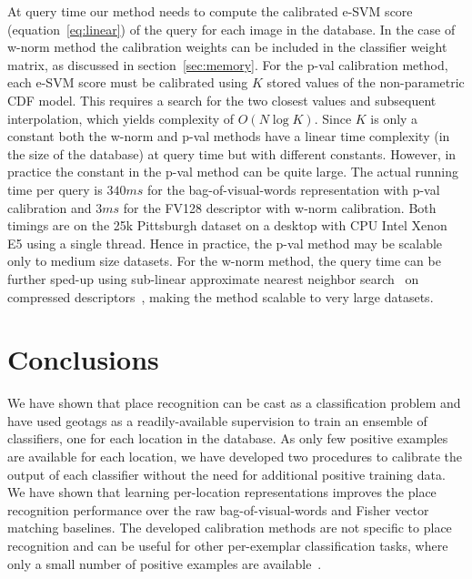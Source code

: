     {
        At query time our method needs to compute the calibrated e-SVM score (equation~\eqref{eq:linear}) of the query for each image in the database. In the case of w-norm method the calibration weights can be included in the classifier weight matrix, as discussed in section~\ref{sec:memory}. For the p-val calibration method, each e-SVM score must be calibrated using $K$ stored values of the non-parametric CDF model. This requires a search for the two closest values and subsequent interpolation, which yields complexity of $O(N\log{K})$. Since $K$ is only a constant both the w-norm and p-val methods have a linear time complexity (in the size of the database) at query time but with different constants. However, in practice the constant in the p-val method can be quite large. The actual running time per query is $340ms$ for the bag-of-visual-words representation with p-val calibration and $3ms$ for the FV128 descriptor with w-norm calibration. Both timings are on the 25k Pittsburgh dataset on a desktop with CPU Intel Xenon E5 using a single thread.   Hence in practice, the p-val method may be scalable only to medium size datasets. For the w-norm method, the query time can be further sped-up using sub-linear approximate nearest neighbor search~\cite{Flann2014} on compressed descriptors~\cite{Jegou11}, making the method scalable to very large datasets.
    }

\section{Conclusions}
  We have shown that place recognition can be cast as a classification problem and have used geotags as a readily-available supervision to train an ensemble of classifiers, one for each location in the database. As only few positive examples are available for each location, we have developed two procedures to calibrate the output of each classifier without the need for additional positive training data. We have shown that learning per-location representations improves the place recognition performance over the raw bag-of-visual-words and Fisher vector matching baselines. The developed calibration methods are not specific to place recognition and can be useful for other per-exemplar classification tasks, where only a small number of positive examples are available~\cite{Malisiewicz11}.



